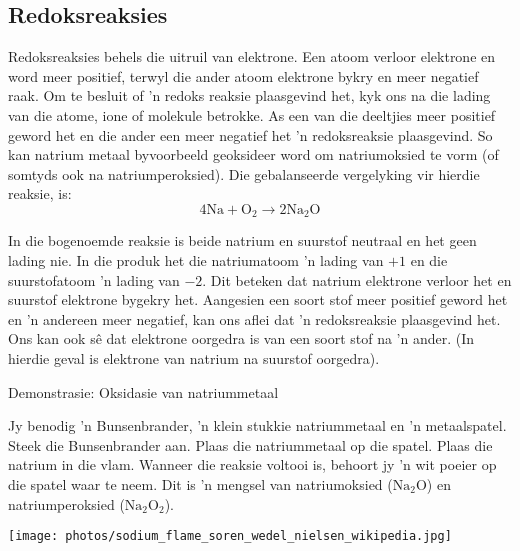             \subsection*{Redoksreaksies }
            \nopagebreak
Redoksreaksies behels die uitruil van elektrone. Een atoom verloor elektrone en word meer positief, terwyl die ander atoom elektrone bykry en meer negatief raak. Om te besluit of 'n redoks reaksie plaasgevind het, kyk ons na die lading van die atome, ione of molekule betrokke. As een van die  deeltjies meer positief geword het en die ander een meer negatief het 'n redoksreaksie plaasgevind. So kan natrium metaal byvoorbeeld geoksideer word om natriumoksied te vorm (of somtyds ook na natriumperoksied). Die gebalanseerde vergelyking vir hierdie reaksie, is:
\label{m38719*id624}\nopagebreak\noindent{}
    \begin{equation*}
    4\text{Na}+{\text{O}}_{2}\to 2{\text{Na}}_{2}{\text{O}}
      \end{equation*}
\par \label{m38719*eip-815}
In die bogenoemde reaksie is beide natrium en suurstof neutraal en het geen lading nie. In die produk het die natriumatoom 'n lading van $+1$ en die suurstofatoom 'n lading van $-2$. Dit beteken dat natrium elektrone verloor het en suurstof elektrone bygekry het. Aangesien een soort stof meer positief geword het en  'n andereen meer negatief, kan ons aflei dat 'n redoksreaksie plaasgevind het. Ons kan ook s\^{e} dat elektrone oorgedra is van een soort stof na  'n ander. (In hierdie geval is elektrone van natrium na suurstof oorgedra).
\par \label{m38719*eip-878}
\vspace{-1cm}
            \begin{g_experiment}{Demonstrasie: Oksidasie van natriummetaal}
            \nopagebreak
            \label{m38719*eip-355}
\begin{minipage}{.6\textwidth}
Jy benodig 'n Bunsenbrander, 'n klein stukkie natriummetaal en 'n metaalspatel. Steek die Bunsenbrander aan. Plaas die natriummetaal op die spatel. Plaas die natrium in die vlam. Wanneer die reaksie voltooi is, behoort jy 'n wit poeier op die spatel waar te neem. Dit is 'n mengsel van natriumoksied (${\text{Na}}_{2}\text{O}$) en natriumperoksied (${\text{Na}}_{2}{\text{O}}_{2}$).
\par \label{m38719*eip-980}
\end{minipage}
\begin{minipage}{.35\textwidth}
 \begin{center}
  \texttt{[image: photos/sodium\_flame\_soren\_wedel\_nielsen\_wikipedia.jpg]}
 \end{center}

\end{minipage}


\end{g_experiment}
